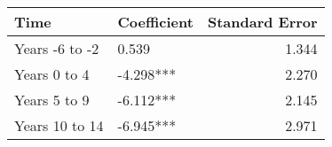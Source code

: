 \begin{tabular}{llr}
\toprule
          Time & Coefficient &  Standard Error \\
\midrule
Years -6 to -2 &       0.539 &           1.344 \\
  Years 0 to 4 &   -4.298*** &           2.270 \\
  Years 5 to 9 &   -6.112*** &           2.145 \\
Years 10 to 14 &   -6.945*** &           2.971 \\
\bottomrule
\end{tabular}
